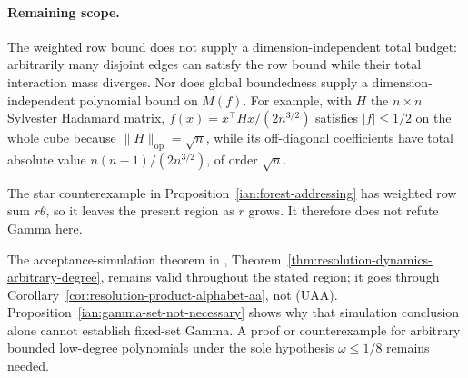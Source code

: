 \paragraph{Remaining scope.}
The weighted row bound does not supply a dimension-independent total
budget: arbitrarily many disjoint edges can satisfy the row bound
while their total interaction mass diverges. Nor does global
boundedness supply a dimension-independent polynomial bound on
\(M(f)\). For example, with \(H\) the \(n\times n\) Sylvester Hadamard matrix, \(f(x)=x^\top Hx/(2n^{3/2})\) satisfies \(|f|\le1/2\) on the whole cube because \(\|H\|_{\mathrm{op}}=\sqrt n\), while its off-diagonal coefficients have total absolute value \(n(n-1)/(2n^{3/2})\), of order \(\sqrt n\).

The star counterexample in Proposition~\ref{ian:forest-addressing}
has weighted row sum \(r\theta\), so it leaves the present region
as \(r\) grows. It therefore does not refute Gamma here.

The acceptance-simulation theorem in
,
Theorem~\ref{thm:resolution-dynamics-arbitrary-degree}, remains valid
throughout the stated region; it goes through
Corollary~\ref{cor:resolution-product-alphabet-aa}, not (UAA). Proposition~\ref{ian:gamma-set-not-necessary}
shows why that simulation conclusion alone cannot establish fixed-set
Gamma. A proof or counterexample for arbitrary bounded low-degree
polynomials under the sole hypothesis \(\omega\le1/8\) remains needed.
